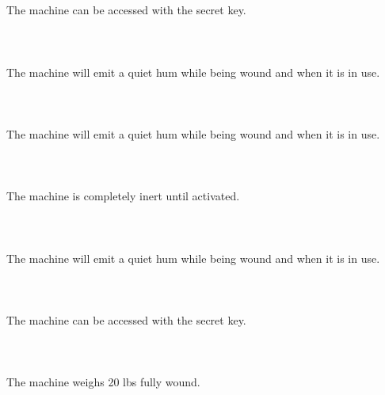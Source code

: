 \documentclass{article}
\begin{document}
    \section{}
    The machine can be accessed with the secret key.\\\\ 
    \newpage
    
    \section{}
    The machine will emit a quiet hum while being wound and when it is in use.\\\\ 
    \newpage
    
    \section{}
    The machine will emit a quiet hum while being wound and when it is in use.\\\\ 
    \newpage
    
    \section{}
    The machine is completely inert until activated.\\\\ 
    \newpage
    
    \section{}
    The machine will emit a quiet hum while being wound and when it is in use.\\\\ 
    \newpage
    
    \section{}
    The machine can be accessed with the secret key.\\\\ 
    \newpage
    
    \section{}
    The machine weighs 20 lbs fully wound.\\\\ 
    \newpage
    
\end{document}
